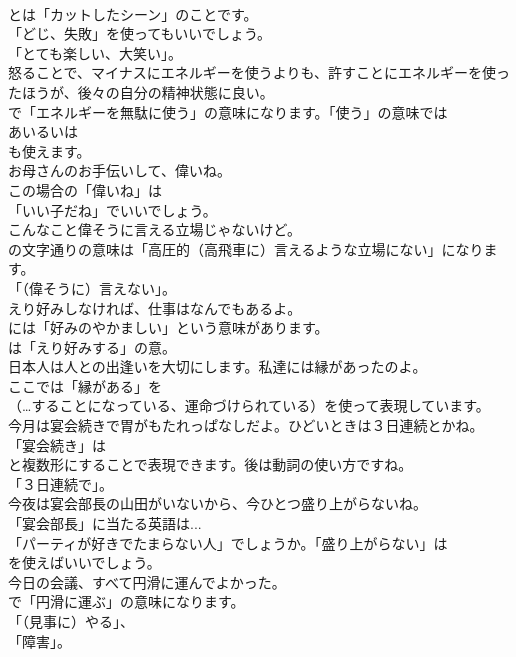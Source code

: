 \documentclass[8pt]{extreport}
\begin{document}
\begin{CJK}{UTF8}{min}
\\	とは「カットしたシーン」のことです。
\\	「どじ、失敗」を使ってもいいでしょう。
\\	「とても楽しい、大笑い」。	
\\	怒ることで、マイナスにエネルギーを使うよりも、許すことにエネルギーを使ったほうが、後々の自分の精神状態に良い。 
\\	で「エネルギーを無駄に使う」の意味になります。「使う」の意味では
\\	あいるいは
\\	も使えます。	
\\	お母さんのお手伝いして、偉いね。 
\\	この場合の「偉いね」は
\\	「いい子だね」でいいでしょう。	
\\	こんなこと偉そうに言える立場じゃないけど。 
\\	の文字通りの意味は「高圧的（高飛車に）言えるような立場にない」になります。
\\	「（偉そうに）言えない」。	
\\	えり好みしなければ、仕事はなんでもあるよ。 
\\	には「好みのやかましい」という意味があります。
\\	は「えり好みする」の意。	
\\	日本人は人との出逢いを大切にします。私達には縁があったのよ。 
\\	ここでは「縁がある」を
\\	（…することになっている、運命づけられている）を使って表現しています。	
\\	今月は宴会続きで胃がもたれっぱなしだよ。ひどいときは３日連続とかね。 
\\	「宴会続き」は
\\	と複数形にすることで表現できます。後は動詞の使い方ですね。
\\	「３日連続で」。	
\\	今夜は宴会部長の山田がいないから、今ひとつ盛り上がらないね。 
\\	「宴会部長」に当たる英語は... 
\\	「パーティが好きでたまらない人」でしょうか。「盛り上がらない」は
\\	を使えばいいでしょう。	
\\	今日の会議、すべて円滑に運んでよかった。 
\\	で「円滑に運ぶ」の意味になります。
\\	「（見事に）やる」、
\\	「障害」。	

\end{CJK}
\end{document}
